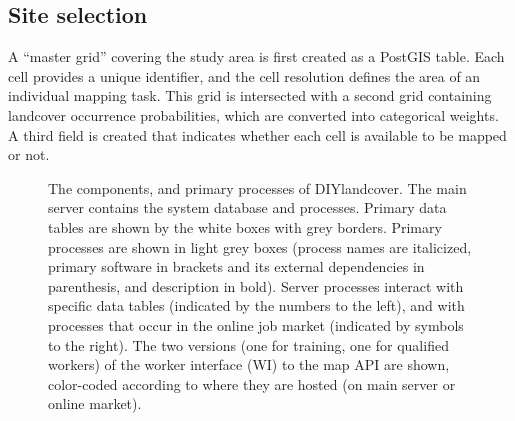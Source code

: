 \documentclass[preprint,12pt,authoryear]{elsarticle}
\begin{document}
\subsection{Site selection}
A ``master grid'' covering the study area is first created as a PostGIS table. Each cell provides a unique identifier, and the cell resolution defines the area of an individual mapping task. This grid is intersected with a second grid containing landcover occurrence probabilities, which are converted into categorical weights. A third field is created that indicates whether each cell is available to be mapped or not.  


\begin{figure}[!ht]
  \begin{center}
    \caption{The components, and primary processes of DIYlandcover. The main server contains the system database and processes. Primary data tables are shown by the white boxes with grey borders. Primary processes are shown in light grey boxes (process names are italicized, primary software in brackets and its external dependencies in parenthesis, and description in bold). Server processes interact with specific data tables (indicated by the numbers to the left), and with processes that occur in the online job market (indicated by symbols to the right). The two versions (one for training, one for qualified workers) of the worker interface (WI) to the map API are shown, color-coded according to where they are hosted (on main server or online market). }
    \label{default}
  \end{center}
\end{figure}
\end{document}

